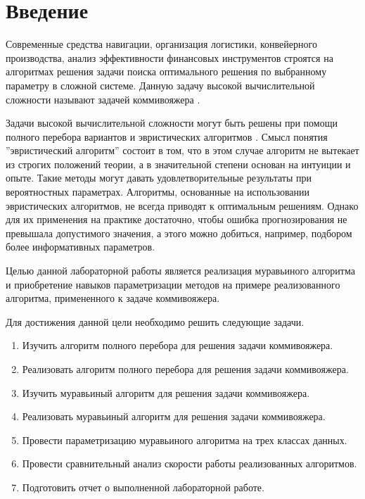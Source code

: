 \chapter*{Введение}

Современные средства навигации, организация логистики, конвейерного производства, анализ эффективности финансовых инструментов строятся на алгоритмах решения задачи поиска оптимального решения по выбранному параметру в сложной системе.
Данную задачу высокой вычислительной сложности называют задачей коммивояжера \cite{task}.

Задачи высокой вычислительной сложности могут быть решены при помощи полного перебора вариантов и эвристических алгоритмов \cite{evr}. Смысл понятия ''эвристический алгоритм'' состоит в том, что в этом случае алгоритм не вытекает из строгих положений теории, а в значительной степени основан на интуиции и опыте. Такие методы могут давать удовлетворительные результаты при вероятностных параметрах. Алгоритмы, основанные на использовании эвристических алгоритмов, не всегда приводят к оптимальным решениям. Однако для их применения на практике достаточно, чтобы ошибка прогнозирования не превышала допустимого значения, а этого можно добиться, например, подбором более информативных параметров.

Целью данной лабораторной работы является реализация муравьиного алгоритма и приобретение навыков параметризации методов на примере реализованного алгоритма, примененного к задаче коммивояжера.

Для достижения данной цели необходимо решить следующие задачи.

\begin{enumerate}
	\item Изучить алгоритм полного перебора для решения задачи коммивояжера.
	\item Реализовать алгоритм полного перебора для решения задачи коммивояжера.
	\item Изучить муравьиный алгоритм для решения задачи коммивояжера.
	\item Реализовать муравьиный алгоритм для решения задачи коммивояжера.
	\item Провести параметризацию муравьиного алгоритма на трех классах
	данных.
	\item Провести сравнительный анализ скорости работы реализованных
	алгоритмов.
	\item Подготовить отчет о выполненной лабораторной работе.
\end{enumerate}